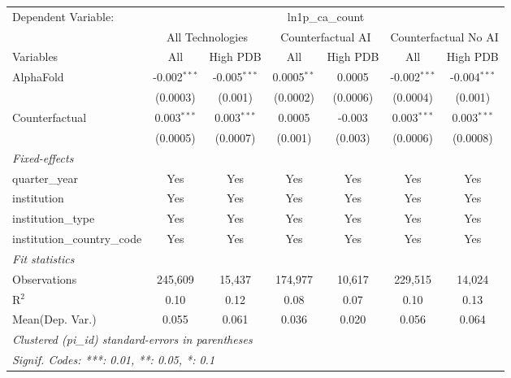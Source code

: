 \begingroup
\centering
\begin{tabular}{lcccccc}
   \tabularnewline \midrule \midrule
   Dependent Variable: & \multicolumn{6}{c}{ln1p\_ca\_count}\\
 & \multicolumn{2}{c}{All Technologies} & \multicolumn{2}{c}{Counterfactual AI} & \multicolumn{2}{c}{Counterfactual No AI} \\
\cmidrule(lr){1-1}\cmidrule(lr){2-3} \cmidrule(lr){4-5} \cmidrule(lr){6-7}
Variables & \multicolumn{1}{c}{All} & \multicolumn{1}{c}{High PDB} & \multicolumn{1}{c}{All} & \multicolumn{1}{c}{High PDB} & \multicolumn{1}{c}{All} & \multicolumn{1}{c}{High PDB} \\
\cmidrule(lr){1-1}\cmidrule(lr){2-2} \cmidrule(lr){3-3} \cmidrule(lr){4-4} \cmidrule(lr){5-5} \cmidrule(lr){6-6} \cmidrule(lr){7-7}
   AlphaFold                    & -0.002$^{***}$ & -0.005$^{***}$ & 0.0005$^{**}$ & 0.0005   & -0.002$^{***}$ & -0.004$^{***}$\\   
                                & (0.0003)       & (0.001)        & (0.0002)      & (0.0006) & (0.0004)       & (0.001)\\   
   Counterfactual               & 0.003$^{***}$  & 0.003$^{***}$  & 0.0005        & -0.003   & 0.003$^{***}$  & 0.003$^{***}$\\   
                                & (0.0005)       & (0.0007)       & (0.001)       & (0.003)  & (0.0006)       & (0.0008)\\   
   \midrule
   \emph{Fixed-effects}\\
   quarter\_year                & Yes            & Yes            & Yes           & Yes      & Yes            & Yes\\  
   institution                  & Yes            & Yes            & Yes           & Yes      & Yes            & Yes\\  
   institution\_type            & Yes            & Yes            & Yes           & Yes      & Yes            & Yes\\  
   institution\_country\_code   & Yes            & Yes            & Yes           & Yes      & Yes            & Yes\\  
   \midrule
   \emph{Fit statistics}\\
   Observations                 & 245,609        & 15,437         & 174,977       & 10,617   & 229,515        & 14,024\\  
   R$^2$                        & 0.10           & 0.12           & 0.08          & 0.07     & 0.10           & 0.13\\  
Mean(Dep. Var.) & 0.055 & 0.061 & 0.036 & 0.020 & 0.056 & 0.064 \\
   \midrule \midrule
   \multicolumn{7}{l}{\emph{Clustered (pi\_id) standard-errors in parentheses}}\\
   \multicolumn{7}{l}{\emph{Signif. Codes: ***: 0.01, **: 0.05, *: 0.1}}\\
\end{tabular}
\par\endgroup
